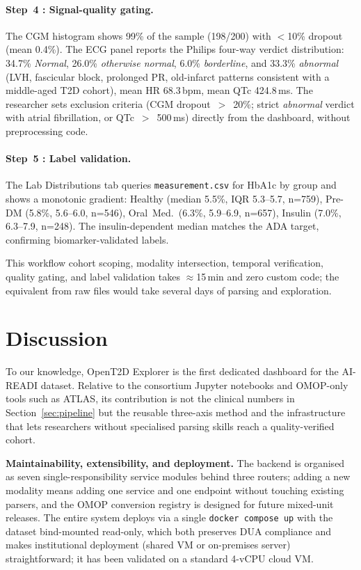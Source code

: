 \documentclass[conference]{IEEEtran}
\begin{document}
\paragraph{Step~4 : Signal-quality gating.} The CGM histogram shows 99\% of the sample (198/200) with $<$10\% dropout (mean 0.4\%). The ECG panel reports the Philips four-way verdict distribution: 34.7\% \emph{Normal}, 26.0\% \emph{otherwise normal}, 6.0\% \emph{borderline}, and 33.3\% \emph{abnormal} (LVH, fascicular block, prolonged PR, old-infarct patterns consistent with a middle-aged T2D cohort), mean HR 68.3\,bpm, mean QTc 424.8\,ms. The researcher sets exclusion criteria (CGM dropout~$>$~20\%; strict \emph{abnormal} verdict with atrial fibrillation, or QTc~$>$~500\,ms) directly from the dashboard, without preprocessing code.

\paragraph{Step~5 : Label validation.} The Lab Distributions tab queries \texttt{measurement.csv} for HbA1c by group and shows a monotonic gradient: Healthy (median 5.5\%, IQR 5.3--5.7, n=759), Pre-DM (5.8\%, 5.6--6.0, n=546), Oral~Med.\ (6.3\%, 5.9--6.9, n=657), Insulin (7.0\%, 6.3--7.9, n=248). The insulin-dependent median matches the ADA target, confirming biomarker-validated labels.

This workflow cohort scoping, modality intersection, temporal verification, quality gating, and label validation takes $\approx$15\,min and zero custom code; the equivalent from raw files would take several days of parsing and exploration.

\section{Discussion}
\label{sec:discussions}
To our knowledge, OpenT2D Explorer is the first dedicated dashboard for the AI-READI dataset. Relative to the consortium Jupyter notebooks and OMOP-only tools such as ATLAS, its contribution is not the clinical numbers in Section~\ref{sec:pipeline} but the reusable three-axis method and the infrastructure that lets researchers without specialised parsing skills reach a quality-verified cohort.

\textbf{Maintainability, extensibility, and deployment.} The backend is organised as seven single-responsibility service modules behind three routers; adding a new modality means adding one service and one endpoint without touching existing parsers, and the OMOP conversion registry is designed for future mixed-unit releases. The entire system deploys via a single \texttt{docker compose up} with the dataset bind-mounted read-only, which both preserves DUA compliance and makes institutional deployment (shared VM or on-premises server) straightforward; it has been validated on a standard 4-vCPU cloud VM.
\end{document}
